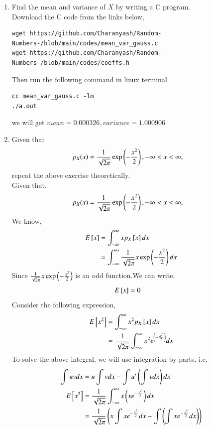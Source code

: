 \documentclass[journal,12pt,twocolumn]{IEEEtran}
\renewcommand\thesection{\arabic{section}}
\begin{document}
\begin{enumerate}[label=\thesection.\arabic*
,ref=\thesection.\theenumi]
\item Find the mean and variance of $X$ by writing a C program.\\
\solution Download the C code from the links below,
\begin{lstlisting}
wget https://github.com/Charanyash/Random-Numbers-/blob/main/codes/mean_var_gauss.c
wget https://github.com/Charanyash/Random-Numbers-/blob/main/codes/coeffs.h
\end{lstlisting}
Then run the following command in linux terminal
\begin{lstlisting}
cc mean_var_gauss.c -lm
./a.out
\end{lstlisting}
we will get $mean = 0.000326, variance = 1.000906$
\item Given that 
\begin{align}
p_{X}(x) &= \frac{1}{\sqrt{2\pi}}\exp\left(-\frac{x^2}{2}\right), -\infty < x < \infty,
\end{align}
repeat the above exercise theoretically.\\
\solution Given that,
 \begin{align}
p_{X}(x) &= \frac{1}{\sqrt{2\pi}}\exp\left(-\frac{x^2}{2}\right), -\infty < x < \infty,
 \end{align} 
 We know,
   \begin{align}
	   E{}\left[x\right] &= \int_{-\infty}^{\infty}xp_{X}{}\left[x\right]dx\\
	              &= \int_{-\infty}^{\infty}\frac{1}{\sqrt{2\pi}}x\exp\left(-\frac{x^2}{2}\right)dx
   \end{align}
 Since $\frac{1}{\sqrt{2\pi}}x\exp\left(-\frac{x^2}{2}\right)$ is an odd function.We can write,
   \begin{align}
	   E{}\left[x\right] &= 0 \label{eq:2-3}
   \end{align}
 Consider the following expression,
   \begin{align}
	   E{}\left[x^{2}\right] &= \int_{-\infty}^{\infty}x^{2}p_{X}{}\left[x\right]dx\\
	                  &=\frac{1}{\sqrt{2\pi}}\int_{-\infty}^{\infty}x^{2}e^{\left(-\frac{x^2}{2}\right)}dx
   \end{align}
To solve the above integral, we will use integration by parts, i.e,\\
  \begin{align}
	  \int uvdx &= u\int vdx -\int u'\brak{\int vdx}dx  \\
	  E\sbrak{x^{2}} &= \frac{1}{\sqrt{2\pi}}\int_{-\infty}^{\infty}x\brak{xe^{-\frac{x^2}{2}}}dx\\
			         &= \frac{1}{\sqrt{2\pi}}\brak{x\int x e^{-\frac{x^2}{2}}dx -  \int\brak{\int xe^{-\frac{x^2}{2}}dx}}

\end{align}
\end{enumerate}
\end{document}
